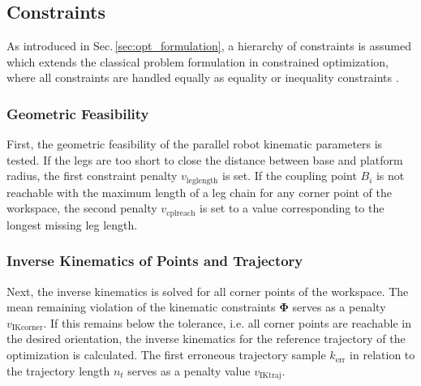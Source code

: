 \documentclass[fleqn,a4paper,10pt]{article}
\newcommand{\bm}[1]{\mathbf{#1}}
\renewcommand{\Phi}[1]{\varPhi{#1}}
\begin{document}
\begin{multicols}{2}


\subsection{Constraints}
\label{sec:opt_constraints}

As introduced in Sec.\,\ref{sec:opt_formulation}, a hierarchy of constraints is assumed \cite{Ramirez2018} which extends the classical problem formulation in constrained optimization, where all constraints are handled equally as equality or inequality constraints \cite{Jordehi2015}.

\subsubsection{Geometric Feasibility}

First, the geometric feasibility of the parallel robot kinematic parameters is tested.
If the legs are too short to close the distance between base and platform radius, the first constraint penalty $v_\mathrm{leglength}$ is set.
If the coupling point $B_i$ is not reachable with the maximum length of a leg chain for any corner point of the workspace, the second penalty $v_\mathrm{cplreach}$ is set to a value corresponding to the longest missing leg length.

\subsubsection{Inverse Kinematics of Points and Trajectory}

Next, the inverse kinematics is solved for all corner points of the workspace.
The mean remaining violation of the kinematic constraints $\bm{\Phi}$ serves as a penalty $v_\mathrm{IKcorner}$.
If this remains below the tolerance, i.e. all corner points are reachable in the desired orientation, the inverse kinematics for the reference trajectory of the optimization is calculated. %
The first erroneous trajectory sample $k_{\mathrm{err}}$ in relation to the trajectory length $n_t$ serves as a penalty value $v_\mathrm{IKtraj}$.


\end{multicols}
\end{document}
